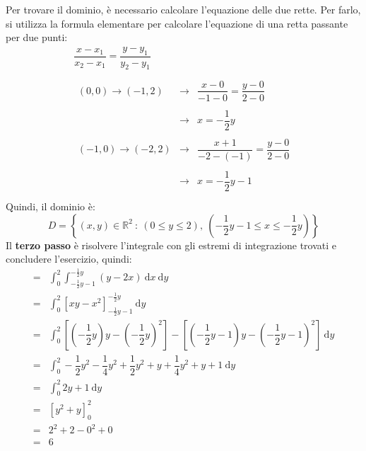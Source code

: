\documentclass[a4paper]{article}
\begin{document}
	\noindent
	Per trovare il dominio, è necessario calcolare l'equazione delle due rette. Per farlo, si utilizza la formula elementare per calcolare l'equazione di una retta passante per due punti:
	\begin{gather*}
		\dfrac{x-x_{1}}{x_{2} - x_{1}} = \dfrac{y-y_{1}}{y_{2} - y_{1}} \\
		\\
		\begin{array}{rcl}
			\left(0,0\right) \rightarrow \left(-1,2\right) &\longrightarrow& \dfrac{x-0}{-1 - 0} = \dfrac{y-0}{2-0} \\
			\\
			&\longrightarrow& x = -\dfrac{1}{2}y \\
			\\
			\left(-1,0\right) \rightarrow \left(-2,2\right) &\longrightarrow& \dfrac{x+1}{-2-\left(-1\right)} = \dfrac{y-0}{2 - 0} \\
			\\
			&\longrightarrow& x = - \dfrac{1}{2}y-1 \\
		\end{array}
	\end{gather*}
	Quindi, il dominio è:
	\begin{equation*}
		D = \left\{\left(x,y\right) \in \mathbb{R}^{2} \: : \: \left(0 \le y \le 2\right), \: \left(-\dfrac{1}{2}y-1 \le x \le -\dfrac{1}{2}y\right)\right\}
	\end{equation*}
	Il \textbf{terzo passo} è risolvere l'integrale con gli estremi di integrazione trovati e concludere l'esercizio, quindi:
	\begin{equation*}
		\begin{array}{ll}
			=& \displaystyle\int_{0}^{2} \int_{-\frac{1}{2}y-1}^{-\frac{1}{2}y} \left(y-2x\right) \: \mathrm{d}x \: \mathrm{d}y \\ [1.5em]
			=& \displaystyle\int_{0}^{2} \left[xy - x^{2}\right]_{-\frac{1}{2}y-1}^{-\frac{1}{2}y} \: \mathrm{d}y \\ [1.5em]
			=& \displaystyle\int_{0}^{2} \left[ \left(-\dfrac{1}{2}y\right)y - \left(-\dfrac{1}{2}y\right)^{2} \right] - \left[ \left(-\dfrac{1}{2}y-1\right)y - \left(-\dfrac{1}{2}y-1\right)^{2} \right] \: \mathrm{d}y \\[1.5em]
			=& \displaystyle\int_{0}^{2} -\dfrac{1}{2}y^{2} - \dfrac{1}{4}y^{2} + \dfrac{1}{2}y^{2} + y + \dfrac{1}{4}y^{2} + y + 1 \: \mathrm{d}y \\ [1.5em]
			=& \displaystyle\int_{0}^{2} 2y + 1 \: \mathrm{d}y \\ [1.5em]
			=& \left[y^{2} + y\right]_{0}^{2} \\ [1em]
			=& 2^{2} + 2 - 0^{2} + 0 \\ [1em]
			=& 6
		\end{array}
	\end{equation*}\newpage
\end{document}
